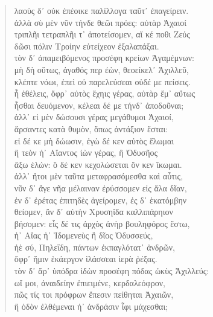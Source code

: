 \begin{Spacing}{1.5}
\begin{verse}
{\large\g  λαοὺς δ᾽ οὐκ ἐπέοικε παλίλλογα ταῦτ᾽ ἐπαγείρειν.  } \\
{\large\g  ἀλλὰ σὺ μὲν νῦν τήνδε θεῶι πρόες: αὐτὰρ Ἀχαιοί  } \\
{\large\g  τριπλῆι τετραπλῆι τ᾽ ἀποτείσομεν, αἴ κέ ποθι Ζεύς  } \\
{\large\g  δῶσι πόλιν Τροίην εὐτείχεον ἐξαλαπάξαι.  } \\
{\large\g  τὸν δ᾽ ἀπαμειβόμενος προσέφη κρείων Ἀγαμέμνων:  } \\
{\large\g  μὴ δὴ οὕτως, ἀγαθός περ ἐὼν, θεοείκελ᾽ Ἀχιλλεῦ,  } \\
{\large\g  κλέπτε νόωι, ἐπεὶ οὐ παρελεύσεαι οὐδέ με πείσεις.  } \\
{\large\g  ἦ ἐθέλεις, ὄφρ᾽ αὐτὸς ἔχηις γέρας, αὐτὰρ ἔμ᾽ αὔτως  } \\
{\large\g  ἧσθαι δευόμενον, κέλεαι δέ με τήνδ᾽ ἀποδοῦναι;  } \\
{\large\g  ἀλλ᾽ εἰ μὲν δώσουσι γέρας μεγάθυμοι Ἀχαιοί,  } \\
{\large\g  ἄρσαντες κατὰ θυμὸν, ὅπως ἀντάξιον ἔσται:  } \\
{\large\g  εἰ δέ κε μὴ δώωσιν, ἐγὼ δέ κεν αὐτὸς ἕλωμαι  } \\
{\large\g  ἢ τεὸν ἠ᾽ Αἴαντος ἰὼν γέρας, ἢ Ὀδυσῆος  } \\
{\large\g  ἄξω ἑλών: ὃ δέ κεν κεχολώσεται ὅν κεν ἵκωμαι.  } \\
{\large\g  ἀλλ᾽ ἤτοι μὲν ταῦτα μεταφρασόμεσθα καὶ αὖτις,  } \\
{\large\g  νῦν δ᾽ ἄγε νῆα μέλαιναν ἐρύσσομεν εἰς ἅλα δῖαν,  } \\
{\large\g  ἐν δ᾽ ἐρέτας ἐπιτηδὲς ἀγείρομεν, ἐς δ᾽ ἑκατόμβην  } \\
{\large\g  θείομεν, ἂν δ᾽ αὐτὴν Χρυσηΐδα καλλιπάρηιον  } \\
{\large\g  βήσομεν: εἷς δέ τις ἀρχὸς ἀνὴρ βουληφόρος ἔστω,  } \\
{\large\g  ἠ᾽ Αἴας ἠ᾽ Ἰδομενεὺς ἢ δῖος Ὀδυσσεύς,  } \\
{\large\g  ἠὲ σύ, Πηλεΐδη, πάντων ἐκπαγλότατ᾽ ἀνδρῶν,  } \\
{\large\g  ὄφρ᾽ ἥμιν ἑκάεργον ἱλάσσεαι ἱερὰ ῥέξας.  } \\
{\large\g  τὸν δ᾽ ἄρ᾽ ὑπόδρα ἰδὼν προσέφη πόδας ὠκὺς Ἀχιλλεύς:  } \\
{\large\g  ωἴ μοι, ἀναιδείην ἐπιειμένε, κερδαλεόφρον,  } \\
{\large\g  πῶς τίς τοι πρόφρων ἔπεσιν πείθηται Ἀχαιῶν,  } \\
{\large\g  ἢ ὁδὸν ἐλθέμεναι ἠ᾽ ἀνδράσιν ἶφι μάχεσθαι;  } \\

\end{verse}
\end{Spacing}
